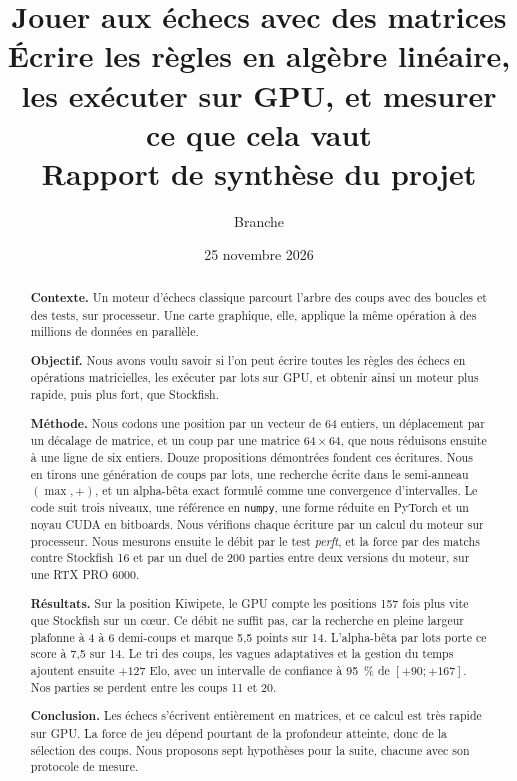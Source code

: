 \documentclass[11pt,a4paper]{article}
\title{Jouer aux échecs avec des matrices\\[4pt]
\large Écrire les règles en algèbre linéaire, les exécuter sur GPU, et mesurer ce que cela vaut\\[2pt]
\normalsize Rapport de synthèse du projet \code{chess-gpu}}
\author{Branche \code{claude/zen-pasteur-vjg9yx}}
\date{25 novembre 2026}
\newcommand{\code}[1]{\texttt{#1}}
\newcounter{calcul}
\theoremstyle{plain}
\begin{document}
\maketitle

\begin{abstract}
\noindent\textbf{Contexte.} Un moteur d'échecs classique parcourt l'arbre des coups avec des
boucles et des tests, sur processeur. Une carte graphique, elle, applique la même opération à des
millions de données en parallèle.

\smallskip\noindent\textbf{Objectif.} Nous avons voulu savoir si l'on peut écrire toutes les
règles des échecs en opérations matricielles, les exécuter par lots sur GPU, et obtenir ainsi un
moteur plus rapide, puis plus fort, que Stockfish.

\smallskip\noindent\textbf{Méthode.} Nous codons une position par un vecteur de 64 entiers, un
déplacement par un décalage de matrice, et un coup par une matrice $64\times64$, que nous
réduisons ensuite à une ligne de six entiers. Douze propositions démontrées fondent ces écritures.
Nous en tirons une génération de coups par lots, une recherche écrite dans le semi-anneau
$(\max,+)$, et un alpha-bêta exact formulé comme une convergence d'intervalles. Le code suit trois
niveaux, une référence en \code{numpy}, une forme réduite en PyTorch et un noyau CUDA en
bitboards. Nous vérifions chaque écriture par un calcul du moteur sur processeur. Nous mesurons
ensuite le débit par le test \emph{perft}, et la force par des matchs contre Stockfish 16 et par
un duel de 200 parties entre deux versions du moteur, sur une RTX PRO 6000.

\smallskip\noindent\textbf{Résultats.} Sur la position Kiwipete, le GPU compte les positions
157 fois plus vite que Stockfish sur un cœur. Ce débit ne suffit pas, car la recherche en pleine
largeur plafonne à 4 à 6 demi-coups et marque 5,5 points sur 14. L'alpha-bêta par lots porte ce
score à 7,5 sur 14. Le tri des coups, les vagues adaptatives et la gestion du temps ajoutent
ensuite $+127$ Elo, avec un intervalle de confiance à 95~\% de $[+90 ; +167]$. Nos parties se
perdent entre les coups 11 et 20.

\smallskip\noindent\textbf{Conclusion.} Les échecs s'écrivent entièrement en matrices, et ce
calcul est très rapide sur GPU. La force de jeu dépend pourtant de la profondeur atteinte, donc de
la sélection des coups. Nous proposons sept hypothèses pour la suite, chacune avec son protocole
de mesure.
\end{abstract}
\end{document}
